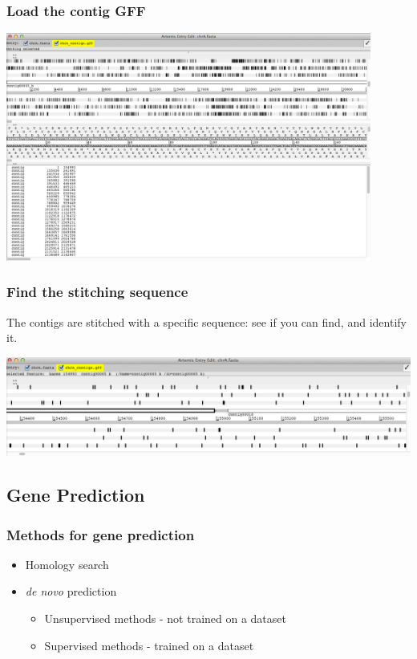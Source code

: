 \documentclass[table]{beamer}
\begin{document}
  \begin{frame}
    \frametitle{Load the contig GFF}
    \begin{center}
      \includegraphics[width=0.9\textwidth]{images/artemis_loaded_contigs} 
    \end{center}
\end{frame}     

  \begin{frame}
    \frametitle{Find the stitching sequence}
    The contigs are stitched with a specific sequence: see if you can find, and identify it.
    \begin{center}
      \includegraphics[width=\textwidth]{images/artemis_stitch_tease} 
    \end{center}
\end{frame}     

  \subsection{Gene Prediction}
    \begin{frame}
     \frametitle{Methods for gene prediction}
     \begin{itemize}
       \item Homology search
       \item \textit{de novo} prediction
       \begin{itemize}
         \item Unsupervised methods - not trained on a dataset
         \item Supervised methods - trained on a dataset
       \end{itemize}
     \end{itemize}
    \end{frame}  
\end{document}
